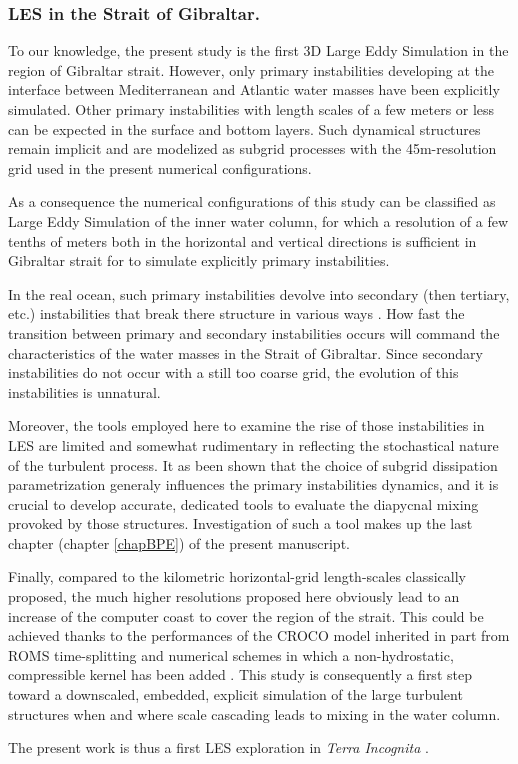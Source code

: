 \subsubsection{LES in the Strait of Gibraltar.}
To our knowledge, the present study is the first 3D Large Eddy Simulation in the region of Gibraltar strait. However, only primary instabilities developing at the interface between Mediterranean and Atlantic water masses have been explicitly simulated. Other primary instabilities  with length scales of a few meters or less can be expected in the surface and bottom layers. Such dynamical structures remain implicit and are modelized as subgrid processes with the 45m-resolution grid used in the present numerical configurations.

As a consequence the numerical configurations of this study can be  classified as Large Eddy Simulation of the inner water column, for which a resolution of a few tenths of meters both in the horizontal and vertical directions is sufficient in Gibraltar strait for to simulate explicitly primary instabilities.

In the real ocean, such primary instabilities devolve into secondary (then tertiary, etc.) instabilities that break there structure in various ways \citep{mashayek_2012}. How fast the transition between primary and secondary instabilities occurs will command the characteristics of the water masses in the Strait of Gibraltar. Since secondary instabilities do not occur with a still too coarse grid, the evolution of this instabilities is unnatural.

Moreover, the tools employed here to examine the rise of those instabilities in LES are limited and somewhat rudimentary in reflecting the stochastical nature of the turbulent process. It as been shown that the choice of subgrid dissipation parametrization generaly influences the primary instabilities dynamics, and it is crucial to develop accurate, dedicated tools to evaluate the diapycnal mixing provoked by those structures. Investigation of such a tool makes up the last chapter (chapter \ref{chapBPE}) of the present manuscript.

Finally, compared to the kilometric horizontal-grid length-scales classically proposed, the much higher resolutions proposed here obviously lead to an increase of the computer coast to cover the region of the strait. This could be achieved thanks to the performances of the CROCO model inherited in part from ROMS time-splitting and numerical schemes \citep{shchepetkin_regional_2005} in which a non-hydrostatic, compressible kernel has been added \citep{auclair_non-hydrostatic_2018, hilt_numerical_2020}. This study is consequently a first step toward a downscaled, embedded, explicit simulation of the large turbulent structures when and where scale cascading leads to mixing in the water column.

The present work is thus a first LES exploration in \textit{Terra Incognita} \citep{scotti_large_2010, wyngaard_toward_2004}.\color{black}
\color{black}
